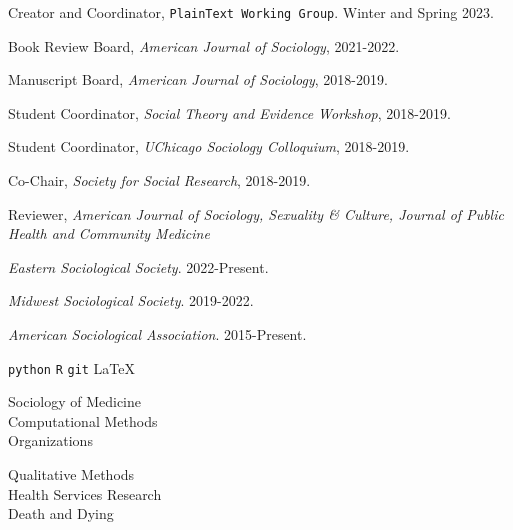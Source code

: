 \documentclass[11pt,article,oneside]{memoir}
\begin{document}

\normalsize

\medskip
{}
\medskip

\ind Creator and Coordinator, \texttt{PlainText Working Group}. Winter and Spring 2023.

\ind Book Review Board, \emph{American Journal of Sociology}, 2021-2022.

\ind Manuscript Board, \emph{American Journal of Sociology}, 2018-2019.

\ind Student Coordinator, \emph{Social Theory and Evidence Workshop}, 2018-2019.

\ind Student Coordinator, \emph{UChicago Sociology Colloquium}, 2018-2019.

\ind Co-Chair, \emph{Society for Social Research}, 2018-2019.

\ind Reviewer, \emph{American Journal of Sociology, Sexuality \& Culture, Journal of Public Health and Community Medicine}

\medskip
{}
\medskip

\ind \emph{Eastern Sociological Society}. 2022-Present.

\ind \emph{Midwest Sociological Society}. 2019-2022.

\ind \emph{American Sociological Association}. 2015-Present.

\bigskip
{}

\medskip

\ind \texttt{python} \hspace{0.4in}  \texttt{R} \hspace{0.4in} \texttt{git} \hspace{0.4in} \LaTeX

\medskip
{}
\bigskip

\vskip 25pt

\begin{minipage}{\textwidth}
	\begin{minipage}{0.48\textwidth}
	Sociology of Medicine \\ Computational Methods \\ Organizations
	\end{minipage}\hfill
	\begin{minipage}{0.52\textwidth}
	Qualitative Methods \\ Health Services Research \\ Death and Dying
	\end{minipage}%
\end{minipage}
\end{document}

